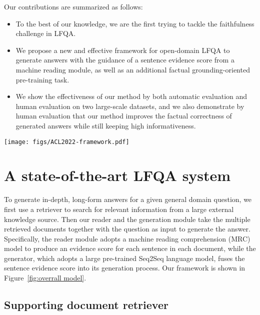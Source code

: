 \documentclass[11pt]{article}
\begin{document}
Our contributions are summarized as follows:
\begin{itemize}
\setlength{\itemsep}{0pt}
\setlength{\parsep}{0pt}
\setlength{\parskip}{0pt}
\item To the best of our knowledge, we are the first trying to tackle the faithfulness challenge in LFQA.
\item We propose a new and effective framework for open-domain LFQA to generate answers with the guidance of a sentence evidence score from a machine reading module, as well as an additional factual grounding-oriented pre-training task.
\item We show the effectiveness of our method by both automatic evaluation and human evaluation on two large-scale datasets, and we also demonstrate by human evaluation that our method improves the factual correctness of generated answers while still keeping high informativeness.


\end{itemize}
\vspace{-2pt}

\begin{figure*}[!ht]
 \centering
 \texttt{[image: figs/ACL2022-framework.pdf]}
  \caption{Overview architecture of our RBG framework. RBG comprises a supporting document retriever, a document reader and a generator.}
  \label{fig:overrall model}
\end{figure*}
 \vspace{-10pt}

\section{A state-of-the-art LFQA system}
\label{sec:methodology}
To generate in-depth, long-form answers for a given general domain question, we first use a retriever to search for relevant information from a large external knowledge source. Then our reader and the generation module take the multiple retrieved documents together with the question as input to generate the answer. Specifically, the reader module adopts a machine reading comprehension (MRC) model to produce an evidence score for each sentence in each document, while the generator, which adopts a large pre-trained Seq2Seq language model, fuses the sentence evidence score into its generation process. Our framework is shown in Figure~\ref{fig:overrall model}.


\subsection{Supporting document retriever}
\end{document}
